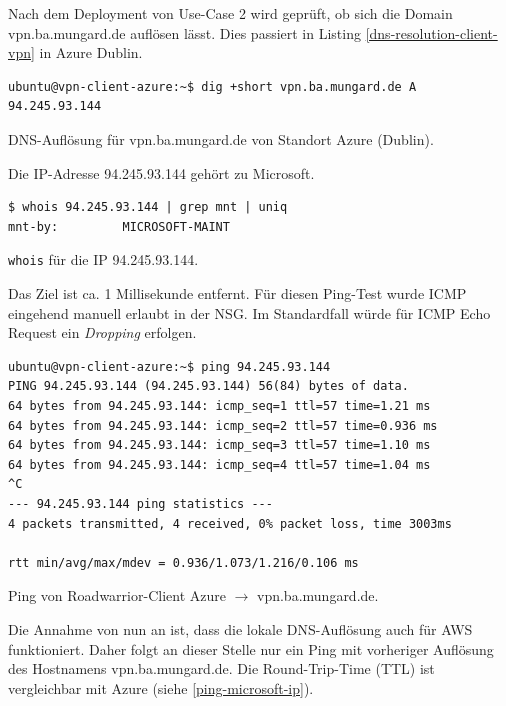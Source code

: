 Nach dem \gls{Deployment} von Use-Case 2 wird geprüft, ob sich die Domain vpn.ba.mungard.de auflösen lässt. Dies passiert in Listing \ref{dns-resolution-client-vpn} in Azure Dublin.
\begin{listing}[h]
\begin{verbatim}
ubuntu@vpn-client-azure:~$ dig +short vpn.ba.mungard.de A
94.245.93.144

\end{verbatim}
\caption{DNS-Auflösung für vpn.ba.mungard.de von Standort Azure (Dublin).}
\label{dns-resolution-client-vpn}
\end{listing}\FloatBarrier
Die IP-Adresse 94.245.93.144 gehört zu Microsoft.
\begin{listing}[h]
\begin{verbatim}
$ whois 94.245.93.144 | grep mnt | uniq
mnt-by:         MICROSOFT-MAINT

\end{verbatim}
\caption{\texttt{whois} für die IP 94.245.93.144.}
\label{whois-microsoft-ip}
\end{listing}\FloatBarrier
Das Ziel ist ca. 1 Millisekunde entfernt. Für diesen Ping-Test wurde ICMP eingehend manuell erlaubt in der NSG. Im Standardfall würde für ICMP Echo Request ein \textit{Dropping} erfolgen.
\begin{listing}[h]
\begin{verbatim}
ubuntu@vpn-client-azure:~$ ping 94.245.93.144
PING 94.245.93.144 (94.245.93.144) 56(84) bytes of data.
64 bytes from 94.245.93.144: icmp_seq=1 ttl=57 time=1.21 ms
64 bytes from 94.245.93.144: icmp_seq=2 ttl=57 time=0.936 ms
64 bytes from 94.245.93.144: icmp_seq=3 ttl=57 time=1.10 ms
64 bytes from 94.245.93.144: icmp_seq=4 ttl=57 time=1.04 ms
^C
--- 94.245.93.144 ping statistics ---
4 packets transmitted, 4 received, 0% packet loss, time 3003ms

rtt min/avg/max/mdev = 0.936/1.073/1.216/0.106 ms

\end{verbatim}
\caption{Ping von Roadwarrior-Client Azure $\rightarrow$ vpn.ba.mungard.de.}
\label{ping-microsoft-ip}
\end{listing}\FloatBarrier
Die Annahme von nun an ist, dass die lokale DNS-Auflösung auch für AWS funktioniert. Daher folgt an dieser Stelle nur ein Ping mit vorheriger Auflösung des Hostnamens vpn.ba.mungard.de. Die Round-Trip-Time (TTL) ist vergleichbar mit Azure (siehe \ref{ping-microsoft-ip}).
